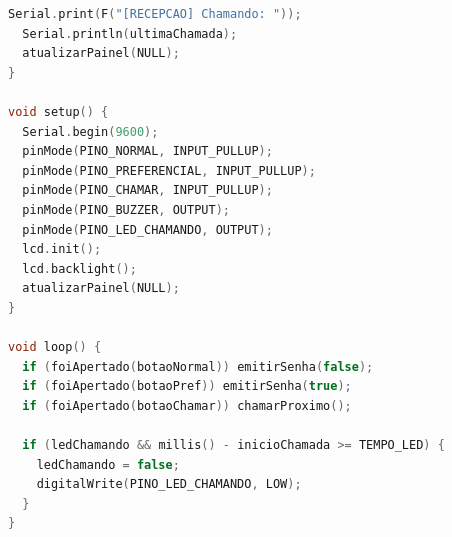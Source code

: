 \documentclass[12pt]{article}
\begin{document}
\begin{lstlisting}[language=C++]
  Serial.print(F("[RECEPCAO] Chamando: "));
  Serial.println(ultimaChamada);
  atualizarPainel(NULL);
}

void setup() {
  Serial.begin(9600);
  pinMode(PINO_NORMAL, INPUT_PULLUP);
  pinMode(PINO_PREFERENCIAL, INPUT_PULLUP);
  pinMode(PINO_CHAMAR, INPUT_PULLUP);
  pinMode(PINO_BUZZER, OUTPUT);
  pinMode(PINO_LED_CHAMANDO, OUTPUT);
  lcd.init();
  lcd.backlight();
  atualizarPainel(NULL);
}

void loop() {
  if (foiApertado(botaoNormal)) emitirSenha(false);
  if (foiApertado(botaoPref)) emitirSenha(true);
  if (foiApertado(botaoChamar)) chamarProximo();

  if (ledChamando && millis() - inicioChamada >= TEMPO_LED) {
    ledChamando = false;
    digitalWrite(PINO_LED_CHAMANDO, LOW);
  }
}
\end{lstlisting}
\end{document}

